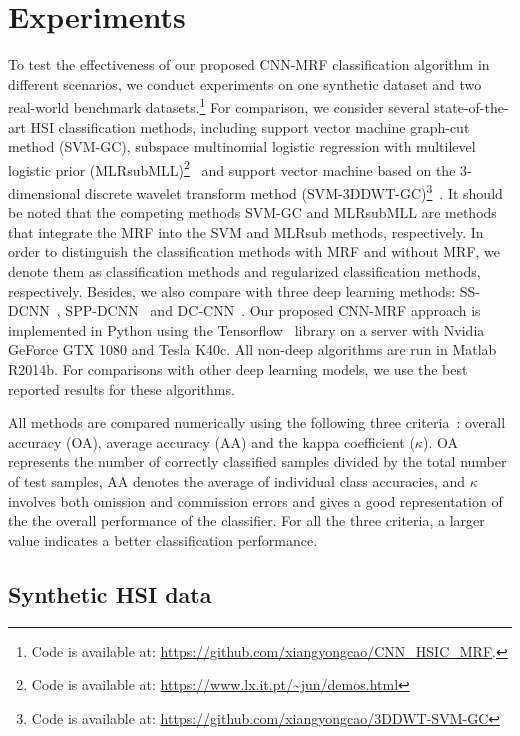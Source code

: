 \documentclass[journal]{IEEEtran}
\begin{document}
		\section{Experiments}
		To test the effectiveness of our proposed CNN-MRF {{classification}} algorithm in different scenarios, we conduct experiments on one synthetic dataset and two real-world benchmark datasets.\footnote{Code is available at: \url{https://github.com/xiangyongcao/CNN_HSIC_MRF}.} For comparison, we consider several state-of-the-art HSI {{classification}} methods, including support vector machine graph-cut method (SVM-GC), subspace multinomial logistic regression with multilevel logistic prior (MLRsubMLL)\footnote{Code is available at: \url{https://www.lx.it.pt/~jun/demos.html}}~\cite{li2012spectral} and support vector machine based on the 3-dimensional discrete wavelet transform method ({{SVM-3DDWT-GC}})\footnote{Code is available at: \url{https://github.com/xiangyongcao/3DDWT-SVM-GC}}~\cite{cao2017integration}. {{It should be noted that the competing methods SVM-GC and MLRsubMLL are methods that integrate the MRF into the SVM and MLRsub methods, respectively. In order 
to distinguish the classification methods with MRF and without MRF, we denote them as classification methods and regularized classification methods, respectively.}} Besides, we also compare with three deep learning methods: SS-DCNN~\cite{yue2015spectral}, SPP-DCNN~\cite{yue2016deep} and DC-CNN~\cite{zhang2017spectral}. Our proposed CNN-MRF approach is implemented in Python using the Tensorflow~\cite{abadi2016tensorflow} library on a server with Nvidia 
		GeForce GTX 1080 and Tesla K40c. All non-deep algorithms are run in Matlab R2014b. For comparisons with other deep learning models, we use the best reported results for these algorithms. 
		
		All methods are compared numerically using the following three criteria~\cite{cao2017integration}: overall accuracy (OA), average accuracy (AA) and the kappa coefficient ($\kappa$). OA represents the number of correctly classified samples divided by the total number of test samples, AA denotes the average of individual class accuracies, and $\kappa$ involves both omission and commission errors and gives a good representation of the the overall performance of the classifier. For all the three criteria, a larger value indicates a better classification performance.
		
		\subsection{Synthetic HSI data}
		
\end{document}
